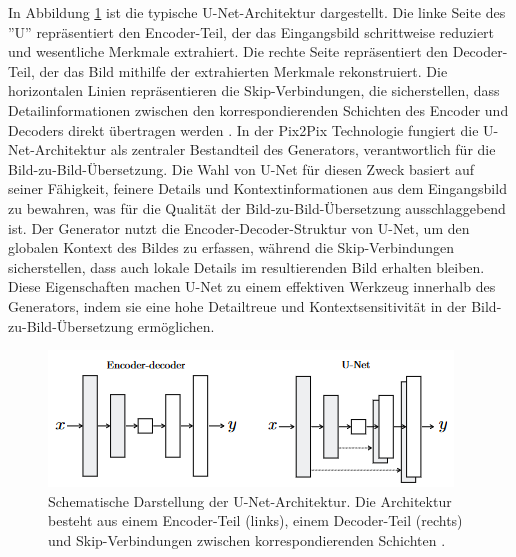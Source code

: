 In Abbildung \ref{fig:unet} ist die typische U-Net-Architektur dargestellt. Die linke Seite des ''U'' repräsentiert den Encoder-Teil, der das Eingangsbild schrittweise reduziert und wesentliche Merkmale extrahiert. Die rechte Seite repräsentiert den Decoder-Teil, der das Bild mithilfe der extrahierten Merkmale rekonstruiert. Die horizontalen Linien repräsentieren die Skip-Verbindungen, die sicherstellen, dass Detailinformationen zwischen den korrespondierenden Schichten des Encoder und Decoders direkt übertragen werden \cite{PhillipIsola.}. \newline 
In der Pix2Pix Technologie fungiert die U-Net-Architektur als zentraler Bestandteil des Generators, verantwortlich für die Bild-zu-Bild-Übersetzung. Die Wahl von U-Net für diesen Zweck basiert auf seiner Fähigkeit, feinere Details und Kontextinformationen aus dem Eingangsbild zu bewahren, was für die Qualität der Bild-zu-Bild-Übersetzung ausschlaggebend ist. Der Generator nutzt die Encoder-Decoder-Struktur von U-Net, um den globalen Kontext des Bildes zu erfassen, während die Skip-Verbindungen sicherstellen, dass auch lokale Details im resultierenden Bild erhalten bleiben. Diese Eigenschaften machen U-Net zu einem effektiven Werkzeug innerhalb des Generators, indem sie eine hohe Detailtreue und Kontextsensitivität in der Bild-zu-Bild-Übersetzung ermöglichen\cite{PhillipIsola.}.

\begin{figure}[h]
	\centering
	\includegraphics[width=0.7\linewidth]{./images/unet.png}
	\caption{Schematische Darstellung der U-Net-Architektur. Die Architektur besteht aus einem Encoder-Teil (links), einem Decoder-Teil (rechts) und Skip-Verbindungen zwischen korrespondierenden Schichten \cite{PhillipIsola.}.}
	\label{fig:unet}
\end{figure}

